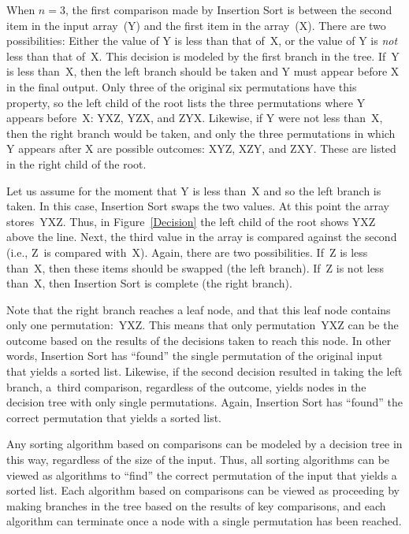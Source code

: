 When \(n = 3\), the first comparison made by Insertion Sort
is between the second item in the input array~(Y) and the first
item in the array~(X).
There are two possibilities:
Either the value of Y is less than that
of~X, or the value of Y is \emph{not} less than that of~X.
This decision is modeled by the first branch in the tree.
If~Y is less than~X, then the left branch should be taken and
Y must appear before X in the final output.
Only three of the original six permutations have this property,
so the left child of the root lists the three
permutations where Y appears before~X: YXZ, YZX, and ZYX.
Likewise, if Y were not less than~X, then the right branch would be
taken, and only the three permutations in which Y appears after X are
possible outcomes: XYZ, XZY, and ZXY.
These are listed in the right child of the root.

Let us assume for the moment that Y is less than~X and so the
left branch is taken.
In this case, Insertion Sort swaps the two values.
At this point the array stores~YXZ.
Thus, in Figure~\ref{Decision} the left child of the root shows YXZ
above the line.
Next, the third value in the array is compared against the second
(i.e., Z~is compared with~X).
Again, there are two possibilities.
If~Z is less than~X, then these items should be swapped (the left
branch).
If~Z is not less than~X, then Insertion Sort is complete (the right
branch).

Note that the right branch reaches a leaf node, and that this leaf node
contains only one permutation:~YXZ.
This means that only permutation~YXZ can be the outcome based
on the results of the decisions taken to reach this node.
In other words, Insertion Sort has ``found'' the single permutation
of the original input that yields a sorted list.
Likewise, if the second decision resulted in taking the left branch,
a~third comparison, regardless of the outcome, yields nodes in the
decision tree with only single permutations.
Again, Insertion Sort has ``found'' the correct
permutation that yields a sorted list.

Any sorting algorithm based on comparisons can be modeled by a
decision tree in this way, regardless of the size of the input.
Thus, all sorting algorithms can be viewed as algorithms to ``find''
the correct permutation of the input that yields a sorted list.
Each algorithm based on comparisons can be viewed as proceeding by
making branches in the tree based on the results of key comparisons,
and each algorithm can terminate once a node with a single permutation
has been reached.

